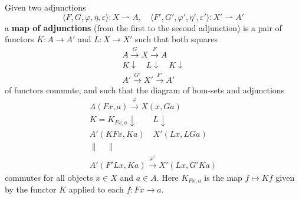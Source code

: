 Given two adjunctions
$$\langle F, G, \varphi, \eta, \varepsilon \rangle : X \rightharpoonup A, \quad \langle F', G', \varphi', \eta', \varepsilon' \rangle : X' \rightharpoonup A'$$
a \textbf{map of adjunctions} (from the first to the second adjunction) is a pair of functors $K : A \to A'$ and $L : X \to X'$ such that both squares
$$\begin{array}{c}
A \xrightarrow{G} X \xrightarrow{F} A \\
K \downarrow \quad L \downarrow \quad K \downarrow \\
A' \xrightarrow{G'} X' \xrightarrow{F'} A'
\end{array}$$
of functors commute, and such that the diagram of hom-sets and adjunctions
$$\begin{array}{c}
A(Fx, a) \xrightarrow{\varphi} X(x, Ga) \\
K = K_{Fx,a} \downarrow \quad \quad L \downarrow \\
A'(KFx, Ka) \quad X'(Lx, LGa) \\
\parallel \quad \parallel \\
A'(F'Lx, Ka) \xrightarrow{\varphi'} X'(Lx, G'Ka)
\end{array}$$
commutes for all objects $x \in X$ and $a \in A$. Here $K_{Fx,a}$ is the map $f \mapsto Kf$ given by the functor $K$ applied to each $f : Fx \to a$.
